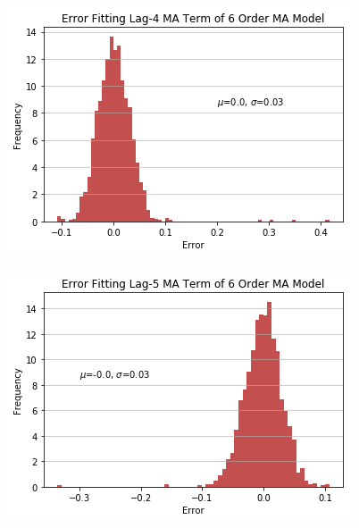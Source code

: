 \documentclass[oneside,12pt,openany]{book}
\begin{document}
	\begin{figure}[!ht]
		\centering
		\includegraphics[width=.85\linewidth]{images/MAModelMALag4CoefDist.png}
	\end{figure}
	\begin{figure}[!ht]
		\centering
		\includegraphics[width=.85\linewidth]{images/MAModelMALag5CoefDist.png}
	\end{figure}
	
\end{document}
